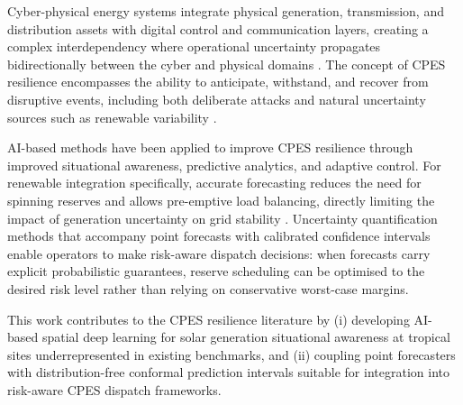 Cyber-physical energy systems integrate physical generation, transmission, and
distribution assets with digital control and communication layers, creating a
complex interdependency where operational uncertainty propagates bidirectionally
between the cyber and physical domains \cite{deng2017}. The concept of CPES
resilience encompasses the ability to anticipate, withstand, and recover from
disruptive events, including both deliberate attacks and natural uncertainty
sources such as renewable variability \cite{bhusal2020}.

AI-based methods have been applied to improve CPES resilience through improved
situational awareness, predictive analytics, and adaptive control.
For renewable integration specifically, accurate forecasting reduces the need for
spinning reserves and allows pre-emptive load balancing, directly limiting the
impact of generation uncertainty on grid stability \cite{energyrev2021}.
Uncertainty quantification methods that accompany point forecasts with calibrated
confidence intervals enable operators to make risk-aware dispatch decisions:
when forecasts carry explicit probabilistic guarantees, reserve scheduling can
be optimised to the desired risk level rather than relying on conservative
worst-case margins.

This work contributes to the CPES resilience literature by (i) developing
AI-based spatial deep learning for solar generation situational awareness at
tropical sites underrepresented in existing benchmarks, and (ii) coupling
point forecasters with distribution-free conformal prediction intervals
suitable for integration into risk-aware CPES dispatch frameworks.
